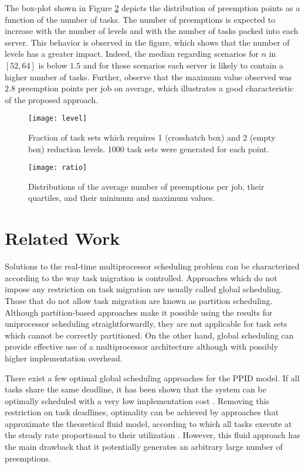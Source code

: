 \documentclass[twocolumn, compsocconf]{IEEEtran}
\newcounter{proc}
\begin{document}
The box-plot shown in Figure \ref{fig:ratio} depicts the distribution of
preemption points as a function of the number of tasks. The number of
preemptions is expected to increase with the number of levels and with the
number of tasks packed into each server. This behavior is observed in the
figure, which shows that the number of levels has a greater impact. Indeed, the
median regarding scenarios for $n$ in $[52,64]$ is below $1.5$ and for those
scenarios each server is likely to contain a higher number of tasks. Further,
observe that the maximum value observed was $2.8$ preemption points per job on
average, which illustrates a good characteristic of the proposed approach.

\begin{figure}[t]
\texttt{[image: level]}
  \caption{Fraction of task sets which requires 1 (crosshatch box) and 2 (empty
    box) reduction levels. 1000 task sets were generated for each point.}
  \label{fig:level}
\end{figure}

\begin{figure}[t]
\texttt{[image: ratio]}
  \caption{Distributions of the average number of preemptions per job, their
    quartiles, and their minimum and maximum values.}
  \label{fig:ratio}
\end{figure}

\section{Related Work}\label{sec:relatedWork}

Solutions to the real-time multiprocessor scheduling problem can be
characterized according to the way task migration is controlled. Approaches
which do not impose any restriction on task migration are usually called global
scheduling. Those that do not allow task migration are known as partition
scheduling. Although partition-based approaches make it possible using the
results for uniprocessor scheduling straightforwardly, they are not applicable
for task sets which cannot be correctly partitioned. On the other hand, global
scheduling can provide effective use of a multiprocessor architecture although
with possibly higher implementation overhead.

There exist a few optimal global scheduling approaches for the PPID model. If
all tasks share the same deadline, it has been shown that the system can be
optimally scheduled with a very low implementation cost
\cite{McNaughton59}. Removing this restriction on task deadlines, optimality can
be achieved by approaches that approximate the theoretical fluid model,
according to which all tasks execute at the steady rate proportional to their
utilization \cite{Baruah96}. However, this fluid approach has the main drawback
that it potentially generates an arbitrary large number of preemptions.
\end{document}
